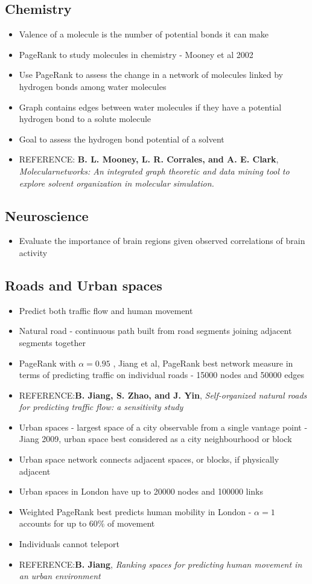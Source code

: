 \documentclass[11pt]{report}
\begin{document}
\subsection{Chemistry}
\begin{itemize}
\item Valence of a molecule is the number of potential bonds it can make
\item PageRank to study molecules in chemistry - Mooney et al 2002
\item Use PageRank to assess the change in a network of molecules linked by hydrogen bonds among water molecules
\item Graph contains edges between water molecules if they have a potential hydrogen bond to a solute molecule
\item Goal to assess the hydrogen bond potential of a solvent
\item REFERENCE: \textbf{B. L. Mooney, L. R. Corrales, and A. E. Clark}, \textit{Molecularnetworks: An integrated graph
theoretic and data mining tool to explore solvent organization in molecular simulation.}
\end{itemize}
\subsection{Neuroscience}
\begin{itemize}
\item Evaluate the importance of brain regions given observed correlations of brain activity
\end{itemize}
\subsection{Roads and Urban spaces}
\begin{itemize}
\item Predict both traffic flow and human movement
\item Natural road - continuous path built from road segments joining adjacent segments together
\item PageRank with $\alpha=0.95$ , Jiang et al, PageRank best network measure in terms of predicting traffic on individual roads - 15000 nodes and 50000 edges
\item REFERENCE:\textbf{B. Jiang, S. Zhao, and J. Yin}, \textit{Self-organized natural roads for predicting traffic flow: a sensitivity
study}
\item Urban spaces - largest space of a city observable from a single vantage point - Jiang 2009, urban space best considered as a city neighbourhood or block
\item Urban space network connects adjacent spaces, or blocks, if physically adjacent
\item Urban spaces in London have up to 20000 nodes and 100000 links
\item Weighted PageRank best predicts human mobility in London - $\alpha=1$ accounts for up to 60\% of movement
\item Individuals cannot teleport
\item REFERENCE:\textbf{B. Jiang}, \textit{Ranking spaces for predicting human movement in an urban environment}
\end{itemize}
\end{document}
